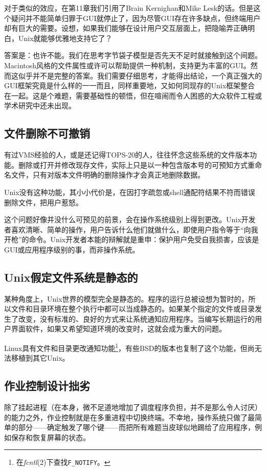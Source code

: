 \documentclass[12pt,oneside]{ctexbook}
\begin{document}
\begin{common-format}
对于类似的效应，在第11章我们引用了Brain Kernighan和Mike Lesk的话。但是这个疑问并不能简单归罪于GUI就停止了，因为尽管GUI存在许多缺点，但终端用户却有巨大的需要。设想，如果我们能够在设计用户交互层面上，把隐喻弄正确明白，Unix就能够优雅地支持它了？

答案是：也许不能。我们在思考字节袋子模型是否先天不足时就接触到这个间题。Macintosh风格的文件属性或许可以帮助提供一种机制，支持更为丰富的GUI。然而这似乎并不是完整的答案。我们需要仔细思考，才能得出结论，一个真正强大的GUI框架究竟是什么样的一一而且，同样重要地，又如何同现存的Unix框架整合在一起。这是个难题，需要基础性的顿悟，但在喧闹而令人困惑的大众软件工程或学术研究中还未出现。

\subsection{文件删除不可撤销}
有过VMS经验的人，或是还记得TOPS-20的人，往往怀念这些系统的文件版本功能。删除或打开并修改现存文件，实际上只是以一种包含版本号的可预知方式重命名文件，只有对版本文件明确的删除操作才会真正地删除数据。

Unix没有这种功能，其小小代价是，在因打字疏忽或shell通配符结果不符而错误删除文件，把用户惹怒。

这个问题好像并没什么可预见的前景，会在操作系统级别上得到更改。Unix开发者喜欢清晰、简单的操作，用户告诉什么他们就做什么，即使用户指令等于“向我开枪”的命令。Unix开发者本能的辩解就是重申：保护用户免受自我损害，应该是GUI或应用程序级别的事，而非操作系统。

\subsection{Unix假定文件系统是静态的}
某种角度上，Unix世界的模型完全是静态的。程序的运行总被设想为暂时的，所以文件和目录环境在整个执行中都可以当成静态的。如果某个指定的文件或目录发生了改变，没有标准的、良好的方式来让系统通知应用程序。当编写长期运行的用户界面软件，如果又希望知道环境的改变时，这就会成为重大的问题。

Linux具有文件和目录更改通知功能\footnote{在\textit{fcntl}(2)下查找\verb+F_NOTIFY+。}，有些BSD的版本也复制了这个功能，但尚无法移植到其它Unix。

\subsection{作业控制设计拙劣}
除了挂起进程（在本身，微不足道地增加了调度程序负担，并不是那么令人讨厌）的能力之外，作业控制就是在多重进程中切换终端。不幸地，操作系统只做了最简单的部分——确定触发了哪个键——而把所有难题当皮球似地踢给了应用程序，例如保存和恢复屏幕的状态。


\end{common-format}
\end{document}
